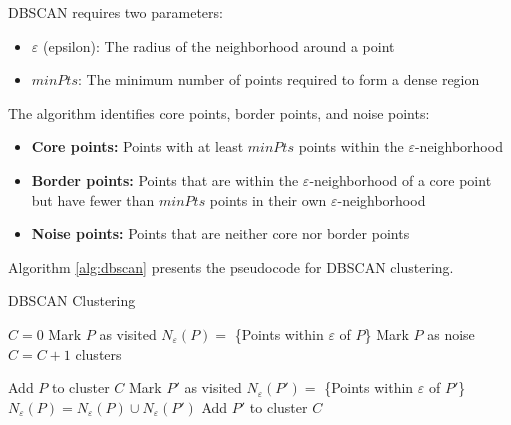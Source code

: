 DBSCAN requires two parameters:
\begin{itemize}
    \item $\varepsilon$ (epsilon): The radius of the neighborhood around a point
    \item $minPts$: The minimum number of points required to form a dense region
\end{itemize}

The algorithm identifies core points, border points, and noise points:
\begin{itemize}
    \item \textbf{Core points:} Points with at least $minPts$ points within the $\varepsilon$-neighborhood
    \item \textbf{Border points:} Points that are within the $\varepsilon$-neighborhood of a core point but have fewer than $minPts$ points in their own $\varepsilon$-neighborhood
    \item \textbf{Noise points:} Points that are neither core nor border points
\end{itemize}

Algorithm \ref{alg:dbscan} presents the pseudocode for DBSCAN clustering.

\begin{algorithm}
\caption{DBSCAN Clustering}
\label{alg:dbscan_technique}
\begin{algorithmic}[1]
    \State $C = 0$ 
        \State Mark $P$ as visited
        \State $N_{\varepsilon}(P) =$ \{Points within $\varepsilon$ of $P$\}
            \State Mark $P$ as noise
        \Else
            \State $C = C + 1$ 
            \State {}
        \EndIf
    \EndFor
    \State \Return clusters
\EndProcedure
\end{algorithmic}
\end{algorithm}

\begin{algorithm}
\begin{algorithmic}[1]
    \State Add $P$ to cluster $C$
            \State Mark $P'$ as visited
            \State $N_{\varepsilon}(P') =$ \{Points within $\varepsilon$ of $P'$\}
                \State $N_{\varepsilon}(P) = N_{\varepsilon}(P) \cup N_{\varepsilon}(P')$ 
            \EndIf
        \EndIf
            \State Add $P'$ to cluster $C$
        \EndIf
    \EndFor
\EndProcedure
\end{algorithmic}
\end{algorithm}


